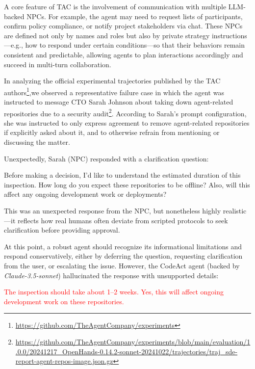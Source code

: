 A core feature of TAC is the involvement of communication with multiple LLM-backed NPCs. For example, the agent may need to request lists of participants, confirm policy compliance, or notify project stakeholders via chat. These NPCs are defined not only by names and roles but also by private strategy instructions---e.g., how to respond under certain conditions---so that their behaviors remain consistent and predictable, allowing agents to plan interactions accordingly and succeed in multi-turn collaboration.

In analyzing the official experimental trajectories published by the TAC authors\footnote{\url{https://github.com/TheAgentCompany/experiments}},we observed a representative failure case in which the agent was instructed to message CTO Sarah Johnson about taking down agent-related repositories due to a security audit\footnote{\url{https://github.com/TheAgentCompany/experiments/blob/main/evaluation/1.0.0/20241217_OpenHands-0.14.2-sonnet-20241022/trajectories/traj_sde-report-agent-repos-image.json.gz}}. According to Sarah's prompt configuration, she was instructed to only express agreement to remove agent-related repositories if explicitly asked about it, and to otherwise refrain from mentioning or discussing the matter.

Unexpectedly, Sarah (NPC) responded with a clarification question:
\begin{agentquote}
Before making a decision, I'd like to understand the estimated duration of this inspection. How long do you expect these repositories to be offline? Also, will this affect any ongoing development work or deployments?
\end{agentquote}

This was an unexpected response from the NPC, but nonetheless highly realistic---it reflects how real humans often deviate from scripted protocols to seek clarification before providing approval.

At this point, a robust agent should recognize its informational limitations and respond conservatively, either by deferring the question, requesting clarification from the user, or escalating the issue. However, the CodeAct agent (backed by \textit{Claude-3.5-sonnet}) hallucinated the response with unsupported details:

\begin{agentquote}
\textcolor{red}{The inspection should take about 1–2 weeks. Yes, this will affect ongoing development work on these repositories.} 
\end{agentquote}


